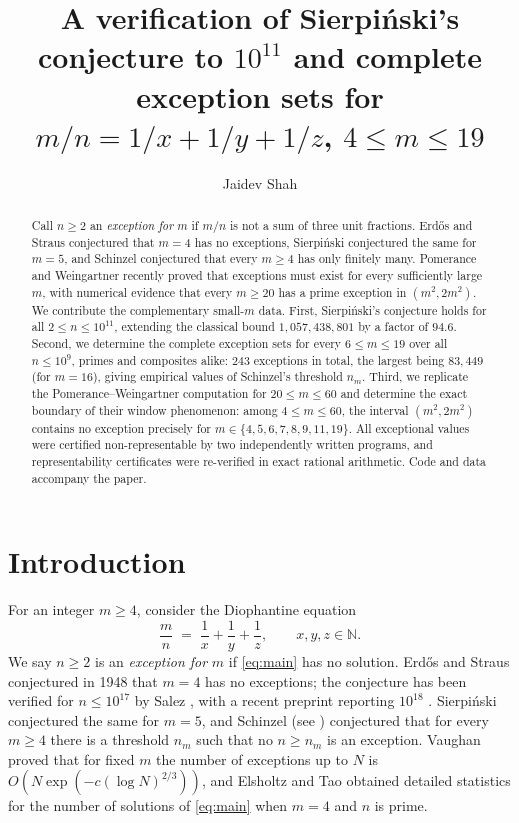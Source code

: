 \documentclass[11pt]{amsart}
\title[Exception sets for $m/n = 1/x+1/y+1/z$]{A verification of Sierpi\'nski's conjecture to $10^{11}$ and complete exception sets for $m/n = 1/x + 1/y + 1/z$, $4 \le m \le 19$}
\author{Jaidev Shah}
\theoremstyle{remark}
\theoremstyle{definition}
\newcommand{\N}{\mathbb{N}}
\begin{document}
\begin{abstract}
Call $n \ge 2$ an \emph{exception for} $m$ if $m/n$ is not a sum of three
unit fractions. Erd\H{o}s and Straus conjectured that $m=4$ has no
exceptions, Sierpi\'nski conjectured the same for $m=5$, and Schinzel
conjectured that every $m \ge 4$ has only finitely many. Pomerance and
Weingartner recently proved that exceptions must exist for every
sufficiently large $m$, with numerical evidence that every $m \ge 20$
has a prime exception in $(m^2, 2m^2)$. We contribute the complementary
small-$m$ data. First, Sierpi\'nski's conjecture holds for all
$2 \le n \le 10^{11}$, extending the classical bound $1{,}057{,}438{,}801$
by a factor of $94.6$. Second, we determine the complete exception sets
for every $6 \le m \le 19$ over all $n \le 10^9$, primes and composites
alike: $243$ exceptions in total, the largest being $83{,}449$ (for
$m=16$), giving empirical values of Schinzel's threshold $n_m$. Third,
we replicate the Pomerance--Weingartner computation for $20 \le m \le 60$
and determine the exact boundary of their window phenomenon: among
$4 \le m \le 60$, the interval $(m^2, 2m^2)$ contains no exception
precisely for $m \in \{4,5,6,7,8,9,11,19\}$. All exceptional values were
certified non-representable by two independently written programs, and
representability certificates were re-verified in exact rational
arithmetic. Code and data accompany the paper.
\end{abstract}

\maketitle

\section{Introduction}

For an integer $m \ge 4$, consider the Diophantine equation
\begin{equation}\label{eq:main}
\frac{m}{n} \;=\; \frac{1}{x} + \frac{1}{y} + \frac{1}{z},
\qquad x, y, z \in \N.
\end{equation}
We say $n \ge 2$ is an \emph{exception for} $m$ if \eqref{eq:main} has no
solution. Erd\H{o}s and Straus \cite{erdos1950} conjectured in 1948 that
$m = 4$ has no exceptions; the conjecture has been verified for
$n \le 10^{17}$ by Salez \cite{salez2014}, with a recent preprint
reporting $10^{18}$ \cite{mihnea2025}. Sierpi\'nski \cite{sierpinski1956}
conjectured the same for $m = 5$, and Schinzel (see \cite{sierpinski1956})
conjectured that for every $m \ge 4$ there is a threshold $n_m$ such that
no $n \ge n_m$ is an exception. Vaughan \cite{vaughan1970} proved that for
fixed $m$ the number of exceptions up to $N$ is
$O\!\left(N \exp(-c(\log N)^{2/3})\right)$, and Elsholtz and Tao
\cite{elsholtztao2013} obtained detailed statistics for the number of
solutions of \eqref{eq:main} when $m = 4$ and $n$ is prime.
\end{document}
